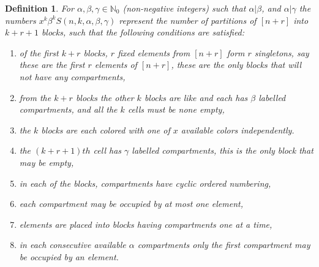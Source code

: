 \documentclass[12pt]{amsart}
\newtheorem{proof 1}{proof 1}
\newtheorem{definition}{Definition}[section]
\begin{document}
\begin{definition}\label{definition:110}For $\alpha,\beta,\gamma\in\mathbb{N}_0$ (non-negative integers) such that $\alpha|\beta$, and $\alpha|\gamma$ the numbers $x^{k}\beta^{k}S(n,k,\alpha,\beta,\gamma)$ represent the number of partitions of $[n+r]$  into $k+r+1$ blocks, such that the following conditions are satisfied:
	\begin{enumerate}
		\item of the first $k+r$ blocks, $r$ fixed elements from $[n+r]$ form $r$ singletons, say these are the first $r$ elements of $[n+r]$, these are the only blocks that will not have any compartments,
		\item from the $k+r$ blocks the other $k$ blocks are like and each has $\beta$ labelled compartments, and all the $k$ cells must be none empty, 
			\item the  $k$ blocks are each colored with one of $x$ available colors independently. 
		\item the $(k+r+1)th$ cell has $\gamma$ labelled compartments, this is the only block that may be empty,
	
		\item  in each of the blocks, compartments have cyclic ordered numbering,
		\item each compartment may be occupied by at most one element,
		\item elements are placed into blocks having compartments one at a time,
		\item in each consecutive available $\alpha$ compartments only the first compartment may be occupied by an element.
	\end{enumerate}
\end{definition}

\end{document}
